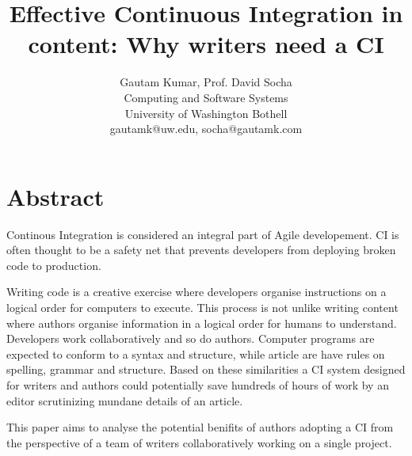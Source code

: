 \documentclass[10pt,conference]{IEEEtran}
\begin{document}
\title{Effective Continuous Integration in content: \newline Why writers need 
a CI}


\author{
{\rm Gautam Kumar, Prof. David Socha}\\
Computing and Software Systems\\
University of Washington Bothell\\
gautamk@uw.edu, socha@gautamk.com
} %

\maketitle
\thispagestyle{empty}


\section*{Abstract}
Continous Integration is considered an integral part of Agile developement. CI 
is often thought to be a safety net that prevents developers from deploying 
broken code to production. 

Writing code is a creative exercise where developers organise instructions on 
a logical order for computers to execute. This process is not unlike writing 
content where authors organise information in a logical order for humans to 
understand. Developers work collaboratively and so do authors. Computer 
programs are expected to conform to a syntax and structure, while article are 
have rules on spelling, grammar and structure. Based on these similarities a 
CI system designed for writers and authors could potentially save hundreds of 
hours of work by an editor scrutinizing mundane details of an article.

This paper aims to analyse the potential benifits of authors adopting a CI 
from the perspective of a team of writers collaboratively working on a single 
project. 



\end{document}

